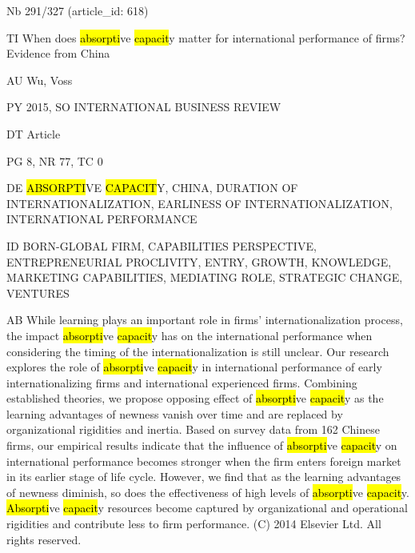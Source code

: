 \documentclass[a4paper]{article}
\begin{document}
\vspace*{-2cm}
Nb \tabto{0cm}291/327 (article\_id: 618)\par
TI \tabto{0cm}When does \hl{absorpti}ve \hl{capacit}y matter for international performance of firms? Evidence from China\par
AU \tabto{0cm}Wu, Voss\par
PY \tabto{0cm}2015, SO INTERNATIONAL BUSINESS REVIEW\par
DT \tabto{0cm}Article\par
PG \tabto{0cm}8, NR 77, TC 0\par
DE \tabto{0cm}\hl{ABSORPTI}VE \hl{CAPACIT}Y, CHINA, DURATION OF INTERNATIONALIZATION, EARLINESS OF INTERNATIONALIZATION, INTERNATIONAL PERFORMANCE\par
ID \tabto{0cm}BORN-GLOBAL FIRM, CAPABILITIES PERSPECTIVE, ENTREPRENEURIAL PROCLIVITY, ENTRY, GROWTH, KNOWLEDGE, MARKETING CAPABILITIES, MEDIATING ROLE, STRATEGIC CHANGE, VENTURES\par
AB \tabto{0cm}While learning plays an important role in firms' internationalization process, the impact \hl{absorpti}ve \hl{capacit}y has on the international performance when considering the timing of the internationalization is still unclear. Our research explores the role of \hl{absorpti}ve \hl{capacit}y in international performance of early internationalizing firms and international experienced firms. Combining established theories, we propose opposing effect of \hl{absorpti}ve \hl{capacit}y as the learning advantages of newness vanish over time and are replaced by organizational rigidities and inertia. Based on survey data from 162 Chinese firms, our empirical results indicate that the influence of \hl{absorpti}ve \hl{capacit}y on international performance becomes stronger when the firm enters foreign market in its earlier stage of life cycle. However, we find that as the learning advantages of newness diminish, so does the effectiveness of high levels of \hl{absorpti}ve \hl{capacit}y. \hl{Absorpti}ve \hl{capacit}y resources become captured by organizational and operational rigidities and contribute less to firm performance. (C) 2014 Elsevier Ltd. All rights reserved.\par
\clearpage
\end{document}

